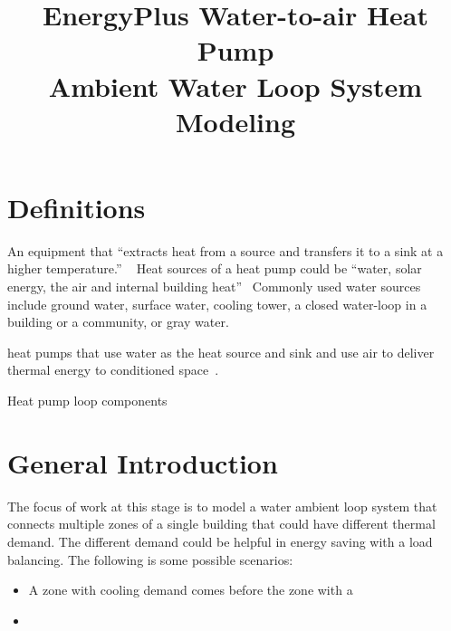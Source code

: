 \documentclass[hidelinks,12pt]{article}
\begin{document}
\title{EnergyPlus Water-to-air Heat Pump\\
       \large Ambient Water Loop System Modeling}
\maketitle
\tableofcontents
\newpage
\section{Definitions}\label{sec:def}
\begin{description}
\item[heat pump] An equipment that ``extracts heat from a source and
  transfers it to a sink at a higher temperature.'' ~\cite{ASHRAE2012}
  Heat sources of a heat pump could be ``water, solar energy, the air
  and internal building heat''~\cite{ASHRAE2012} Commonly used water
  sources include ground water, surface water, cooling tower, a closed
  water-loop in a building or a community, or gray water.
\item[water-to-air heat pump] heat pumps that use water as the heat
  source and sink and use air to deliver thermal energy to conditioned
  space~\cite{ASHRAE2012}.
\item Heat pump loop components
\end{description}
\section{General Introduction}\label{sec:intro}
The focus of work at this stage is to model a water ambient loop
system that connects multiple zones of a single building that could
have different thermal demand. The different demand could be helpful
in energy saving with a load balancing. The following is some possible
scenarios:
\begin{itemize}
\item A zone with cooling demand comes before the zone with a 
\item 
\end{itemize}
\newpage


\end{document}
